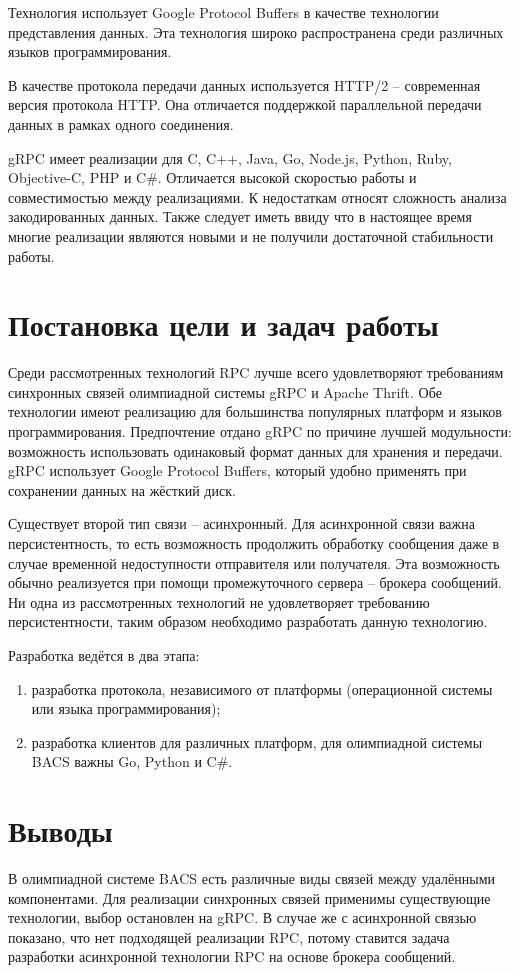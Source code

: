 Технология использует Google Protocol Buffers в качестве технологии
представления данных. Эта технология широко распространена среди
различных языков программирования.

В качестве протокола передачи данных используется HTTP/2 -- современная
версия протокола HTTP. Она отличается поддержкой параллельной передачи
данных в рамках одного соединения.

gRPC имеет реализации для C, C++, Java, Go, Node.js, Python, Ruby, Objective-C,
PHP и C\#. Отличается высокой скоростью работы и совместимостью между
реализациями. К недостаткам относят сложность анализа закодированных данных.
Также следует иметь ввиду что в настоящее время многие реализации являются
новыми и не получили достаточной стабильности работы.

\section{Постановка цели и задач работы}
Среди рассмотренных технологий RPC лучше всего удовлетворяют требованиям
синхронных связей олимпиадной системы gRPC и Apache Thrift. Обе технологии
имеют реализацию для большинства популярных платформ и языков программирования.
Предпочтение отдано gRPC по причине лучшей модульности: возможность
использовать одинаковый формат данных для хранения и передачи. gRPC
использует Google Protocol Buffers, который удобно применять при сохранении
данных на жёсткий диск.

Существует второй тип связи -- асинхронный. Для асинхронной связи
важна персистентность, то есть возможность продолжить обработку сообщения
даже в случае временной недоступности отправителя или получателя.
Эта возможность обычно реализуется при помощи промежуточного сервера --
брокера сообщений. Ни одна из рассмотренных технологий не удовлетворяет
требованию персистентности, таким образом необходимо разработать данную
технологию.

Разработка ведётся в два этапа:
\begin{enumerate}
    \item разработка протокола, независимого от платформы (операционной системы
        или языка программирования);
    \item разработка клиентов для различных платформ, для олимпиадной системы
        BACS важны Go, Python и C\#.
\end{enumerate}

\section{Выводы}
В олимпиадной системе BACS есть различные виды связей между
удалёнными компонентами. Для реализации синхронных связей применимы
существующие технологии, выбор остановлен на gRPC. В случае же с асинхронной
связью показано, что нет подходящей реализации RPC, потому ставится задача
разработки асинхронной технологии RPC на основе брокера сообщений.
